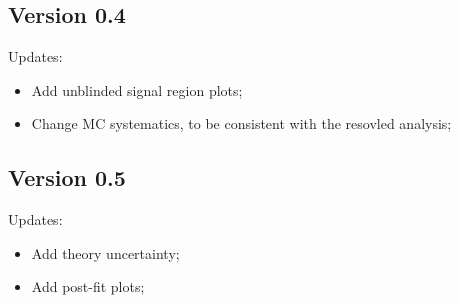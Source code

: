 \subsection{Version 0.4}
Updates:
\begin{itemize}
	\item Add unblinded signal region plots;
	\item Change \ttbar MC systematics, to be consistent with the resovled analysis; 
\end{itemize}


\subsection{Version 0.5}
Updates:
\begin{itemize}
	\item Add theory uncertainty;
	\item Add post-fit plots;
\end{itemize}

\clearpage
